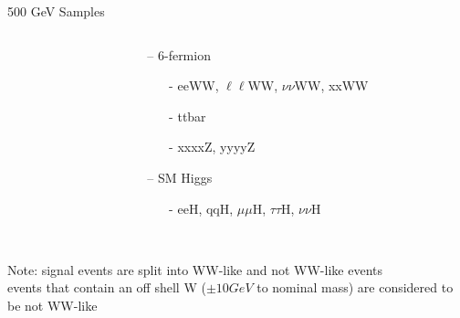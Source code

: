 \documentclass[10pt]{beamer}
\begin{document}
\begin{frame}{500 GeV Samples}
\begin{columns}
\begin{column}{0.5\textwidth}
\end{column}
\begin{column}{0.5\textwidth}
\begin{itemize}
	\item[--] 6-fermion
	\begin{itemize}
		\scriptsize
		\item[-]eeWW, $\ell\ell$WW, $\nu\nu$WW, xxWW
		\item[-]ttbar
		\item[-]xxxxZ, yyyyZ
	\end{itemize}
	\item[--] SM Higgs
		\begin{itemize}
			\scriptsize
			\item[-] eeH, qqH, $\mu\mu$H, $\tau\tau$H, $\nu\nu$H
		\end{itemize}\quad\quad
\end{itemize}
\end{column}
\end{columns}
\quad \quad \\
\scriptsize
Note: signal events are split into WW-like and not WW-like events\\
events that contain an off shell W ($\pm 10 GeV$ to nominal mass) are considered to be not WW-like

\end{frame}
\end{document}
